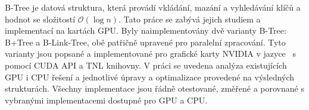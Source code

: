 B-Tree je datová struktura, která provádí vkládání, mazání a vyhledávání klíčů a hodnot se složitostí $\mathcal{O}(\log{n})$. Tato práce se zabývá jejich studiem a implementací na kartách GPU. Byly naimplementovány dvě varianty B-Tree: B+Tree a B-Link-Tree, obě patřičně upravené pro paralelní zpracování. Tyto varianty jsou popsané a implementované pro grafické karty NVIDIA v jazyce \CC\ s pomocí CUDA API a TNL knihovny. V práci se uvedena analýza existujících GPU i CPU řešení a jednotlivé úpravy a optimalizace provedené na výsledných strukturách. Všechny implementace jsou řádně otestované, změřené a porovnané s vybranými implementacemi dostupné pro GPU a CPU.